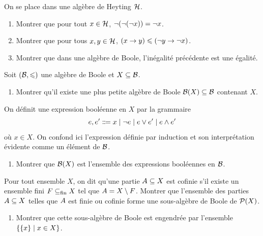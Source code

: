 \begin{exercise}
  On se place dans une algèbre de Heyting $\mathcal{H}$.
  \begin{enumerate}[label=(\roman*)]
  \item Montrer que pour tout $x \in \mathcal{H}$,
    $\lnot(\lnot(\lnot x)) = \lnot x$.
  \item Montrer que pour tous $x,y \in \mathcal{H}$,
    $(x \to y) \leqslant (\lnot y \to \lnot x)$.
  \item Montrer que dans une algèbre de Boole, l'inégalité précédente est
    une égalité.
  \end{enumerate}
\end{exercise}

\begin{exercise}
  Soit $(\mathcal{B},\leqslant)$ une algèbre de Boole et $X\subseteq \mathcal{B}$.
  \begin{enumerate}[label=(\roman*)]
  \item Montrer qu'il existe une plus petite algèbre de Boole
    $\mathcal{B}(X)\subseteq \mathcal{B}$ contenant $X$.
  \end{enumerate}

  \noindent
  On définit une expression booléenne en $X$ par la grammaire
  \[e,e'\inddefeq x \mid \opng e \mid e\opjn e' \mid e \opmt e'\]
  où $x \in X$. On confond ici l'expression définie par induction et son
  interprétation évidente comme un élément de $\mathcal{B}$.
  \begin{enumerate}[label=(\roman*),resume]
  \item Montrer que $\mathcal{B}(X)$ est l'ensemble des expressions booléennes en
    $\mathcal{B}$.
  \end{enumerate}

  \noindent
  Pour tout ensemble $X$, on dit qu'une partie $A \subseteq X$ est
  cofinie s'il existe un ensemble fini $F \subseteq_{\mathrm{fin}} X$ tel que
  $A=X\setminus F$. Montrer que l'ensemble des parties $A\subseteq X$
  telles que $A$ est finie ou cofinie forme une sous-algèbre de
  Boole de $\mathcal{P}(X)$.
  \begin{enumerate}[label=(\roman*),resume]
  \item Montrer que cette sous-algèbre de Boole est engendrée par
    l'ensemble $\left\{ \{x\} \;\middle\vert\; x \in X \right\}$.
  \end{enumerate}
\end{exercise}

